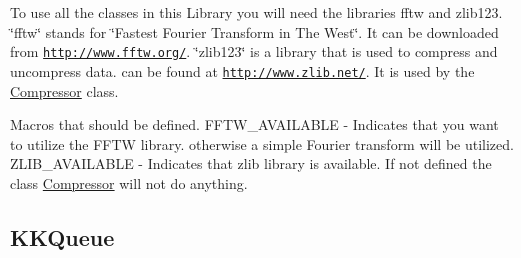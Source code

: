 To use all the classes in this Library you will need the libraries fftw and zlib123. \char`\"{}fftw\char`\"{} stands for \char`\"{}\+Fastest Fourier Transform in The West\char`\"{}. It can be downloaded from \href{http://www.fftw.org/}{\tt http\+://www.\+fftw.\+org/}. \char`\"{}zlib123\char`\"{} is a library that is used to compress and uncompress data. can be found at \href{http://www.zlib.net/}{\tt http\+://www.\+zlib.\+net/}. It is used by the \hyperlink{class_k_k_b_1_1_compressor}{Compressor} class.

Macros that should be defined. \textquotesingle{}F\+F\+T\+W\+\_\+\+A\+V\+A\+I\+L\+A\+B\+LE\textquotesingle{} -\/ Indicates that you want to utilize the F\+F\+TW library. otherwise a simple Fourier transform will be utilized. \textquotesingle{}Z\+L\+I\+B\+\_\+\+A\+V\+A\+I\+L\+A\+B\+LE\textquotesingle{} -\/ Indicates that \textquotesingle{}zlib\textquotesingle{} library is available. If not defined the class \hyperlink{class_k_k_b_1_1_compressor}{Compressor} will not do anything. ~\newline
 \hypertarget{namespace_k_k_b_KKQueue}{}\subsection{K\+K\+Queue}\label{namespace_k_k_b_KKQueue}
